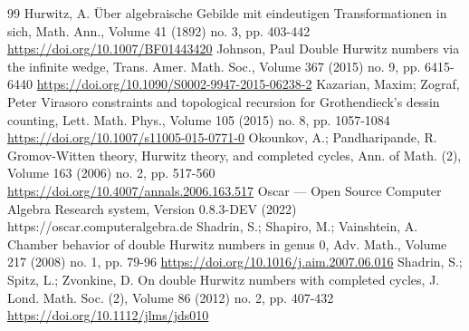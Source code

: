 \documentclass[10pt]{amsart}
\theoremstyle{plain}
\theoremstyle{definition}
\theoremstyle{definition}
\theoremstyle{plain}
\theoremstyle{plain}
\theoremstyle{remark}
\theoremstyle{plain}
\theoremstyle{plain}
\begin{document}
\begin{thebibliography}{99}
 Hurwitz, A. Über algebraische Gebilde mit eindeutigen Transformationen in sich, Math. Ann., Volume 41 (1892) no. 3, pp. 403-442 \url{https://doi.org/10.1007/BF01443420}
 Johnson, Paul Double Hurwitz numbers via the infinite wedge, Trans. Amer. Math. Soc., Volume 367 (2015) no. 9, pp. 6415-6440 \url{https://doi.org/10.1090/S0002-9947-2015-06238-2}
 Kazarian, Maxim; Zograf, Peter Virasoro constraints and topological recursion for Grothendieck’s dessin counting, Lett. Math. Phys., Volume 105 (2015) no. 8, pp. 1057-1084 \url{https://doi.org/10.1007/s11005-015-0771-0}
 Okounkov, A.; Pandharipande, R. Gromov-Witten theory, Hurwitz theory, and completed cycles, Ann. of Math. (2), Volume 163 (2006) no. 2, pp. 517-560 \url{https://doi.org/10.4007/annals.2006.163.517}
 Oscar — Open Source Computer Algebra Research system, Version 0.8.3-DEV (2022) https://oscar.computeralgebra.de
 Shadrin, S.; Shapiro, M.; Vainshtein, A. Chamber behavior of double Hurwitz numbers in genus 0, Adv. Math., Volume 217 (2008) no. 1, pp. 79-96 \url{https://doi.org/10.1016/j.aim.2007.06.016}
 Shadrin, S.; Spitz, L.; Zvonkine, D. On double Hurwitz numbers with completed cycles, J. Lond. Math. Soc. (2), Volume 86 (2012) no. 2, pp. 407-432 \url{https://doi.org/10.1112/jlms/jds010}
\end{thebibliography}
\end{document}
